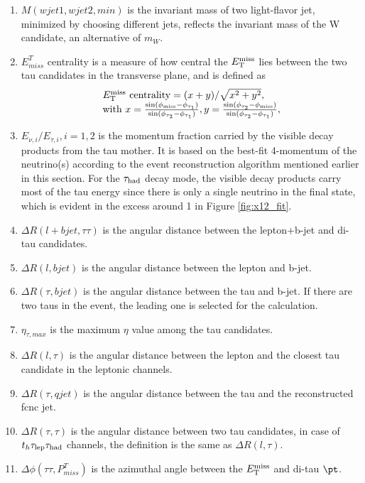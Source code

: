 \begin{enumerate}
\item $M(wjet1,wjet2,min)$ is the invariant mass of two light-flavor jet, minimized by choosing different jets, reflects the invariant mass of the W candidate, an alternative of $m_{W}$.
\item $E^{T}_{miss}$ centrality is a measure of how central the $E_{\text{T}}^{\text{miss}}$ lies between the two tau candidates in the transverse plane, and is defined as
\begin{eqnarray}
\begin{array}{l}
E_{\text{T}}^{\text{miss}}~\text{centrality} = {(x+y)}/{\sqrt{x^2+y^2}}, \\
\text{with}~x=\frac{\sin(\phi_{\text{miss}}-\phi_{\tau_1})}{\sin(\phi_{\tau_2}-\phi_{\tau_1})},  y=\frac{\sin(\phi_{\tau_2}-\phi_{\text{miss}})}{\sin(\phi_{\tau_2}-\phi_{\tau_1})} ,
\end{array}
\label{eq:eq3}
\end{eqnarray}
\item $E_{\nu,i}/E_{\tau,i},i=1,2$ is the momentum fraction carried by the visible decay products from the tau mother. It is based on the best-fit 4-momentum of the neutrino(s) according to the event reconstruction algorithm mentioned earlier in this section. For the $\tau_\text{had}$ decay mode, the visible decay products carry most of the tau energy since there is only a single neutrino in the final state, which is evident in the excess around 1 in Figure \ref{fig:x12_fit}. 
\item $\Delta R(l+bjet,\tau\tau)$ is the angular distance between the lepton+b-jet and di-tau candidates.
\item $\Delta R(l,bjet)$ is the angular distance between the lepton and b-jet.
\item $\Delta R(\tau,bjet)$ is the angular distance between the tau and b-jet. If there are two taus in the event, the leading one is selected for the calculation.
\item $\eta_{\tau,max}$ is the maximum $\eta$ value among the tau candidates.
\item $\Delta R(l,\tau)$ is the angular distance between the lepton and the closest tau candidate in the leptonic channels.
\item $\Delta R(\tau,qjet)$ is the angular distance between the tau and the reconstructed fcnc jet.
\item $\Delta R(\tau,\tau)$ is the angular distance between two tau candidates, in case of $t_h\tau_\text{lep}{}\tau_\text{had}$ channels, the definition is the same as $\Delta R(l,\tau)$.
\item $\Delta\phi(\tau\tau,P^{T}_{miss})$ is the azimuthal angle between the $E_{\text{T}}^{\text{miss}}$ and di-tau $\pt$.


\end{enumerate}
